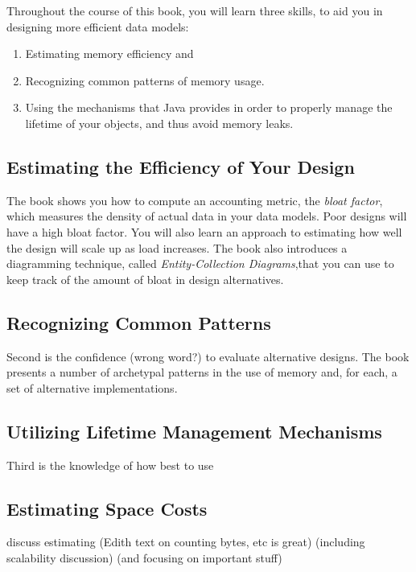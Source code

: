 Throughout the course of this book, you will learn three skills, to aid you in
designing more efficient data models:
\begin{enumerate}
  \item Estimating memory efficiency and 
  \item Recognizing common patterns of memory usage.
  \item Using the mechanisms that Java provides in order to properly manage the
  lifetime of your objects, and thus avoid memory leaks.
\end{enumerate} 


\subsection{Estimating the Efficiency of Your Design}
The book shows you how to compute an accounting metric, the
\emph{bloat factor}, which measures the density of actual data in your data
models.
Poor designs will have a high bloat factor.
You will also learn an approach to estimating how well the design will scale up
as load increases.
The book also introduces a diagramming technique, called \emph{Entity-Collection
Diagrams},that you can use to keep track of the amount of bloat in design
alternatives.

\subsection{Recognizing Common Patterns}
Second is the confidence (wrong word?) to evaluate alternative designs. The book
presents a number of archetypal patterns in the use of memory and, for each, a
set of alternative implementations.

\subsection{Utilizing Lifetime Management Mechanisms}
Third is the knowledge of how best to use 




\subsection{Estimating Space Costs}

discuss estimating (Edith text on counting bytes, etc is great) (including
scalability discussion) (and focusing on important stuff)

